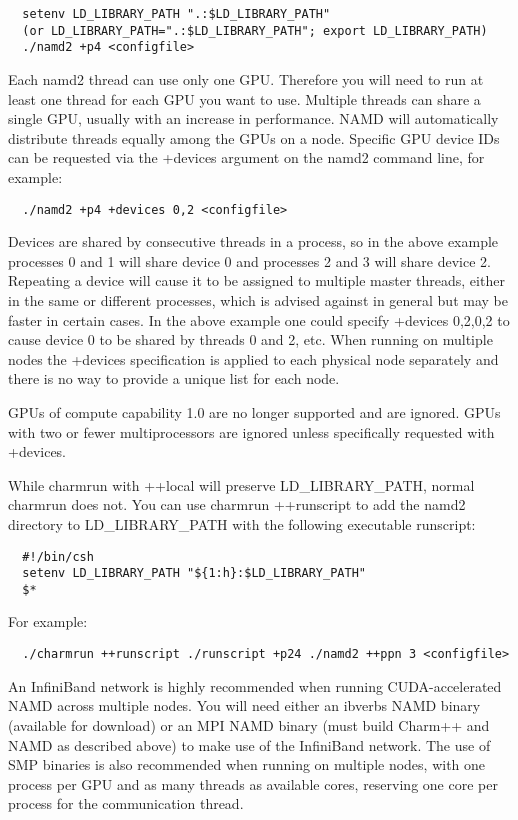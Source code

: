 \begin{verbatim}
  setenv LD_LIBRARY_PATH ".:$LD_LIBRARY_PATH"
  (or LD_LIBRARY_PATH=".:$LD_LIBRARY_PATH"; export LD_LIBRARY_PATH)
  ./namd2 +p4 <configfile>
\end{verbatim}

Each namd2 thread can use only one GPU.  Therefore you will need to run
at least one thread for each GPU you want to use.  Multiple threads
can share a single GPU, usually with an increase in performance.  NAMD
will automatically distribute threads equally among the GPUs on a node.
Specific GPU device IDs can be requested via the +devices argument on
the namd2 command line, for example:

\begin{verbatim}
  ./namd2 +p4 +devices 0,2 <configfile>
\end{verbatim}

Devices are shared by consecutive threads in a process, so in the above
example processes 0 and 1 will share device 0 and processes 2 and 3 will
share device 2.  Repeating a device will cause it to be assigned to
multiple master threads, either in the same or different processes, which
is advised against in general but may be faster in certain cases.  In the
above example one could specify +devices 0,2,0,2 to cause device 0 to be
shared by threads 0 and 2, etc.  When running on multiple nodes the
+devices specification is applied to each physical node separately and
there is no way to provide a unique list for each node.

GPUs of compute capability 1.0 are no longer supported and are ignored.
GPUs with two or fewer multiprocessors are ignored unless specifically
requested with +devices.

While charmrun with ++local will preserve LD\_LIBRARY\_PATH, normal
charmrun does not.  You can use charmrun ++runscript to add the namd2
directory to LD\_LIBRARY\_PATH with the following executable runscript:

\begin{verbatim}
  #!/bin/csh
  setenv LD_LIBRARY_PATH "${1:h}:$LD_LIBRARY_PATH"
  $*
\end{verbatim}

For example:

\begin{verbatim}
  ./charmrun ++runscript ./runscript +p24 ./namd2 ++ppn 3 <configfile>
\end{verbatim}

An InfiniBand network is highly recommended when running CUDA-accelerated
NAMD across multiple nodes.  You will need either an ibverbs NAMD binary
(available for download) or an MPI NAMD binary (must build Charm++ and
NAMD as described above) to make use of the InfiniBand network.  The use
of SMP binaries is also recommended when running on multiple nodes, with
one process per GPU and as many threads as available cores, reserving
one core per process for the communication thread.

